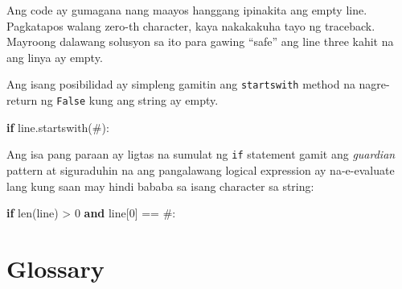 \documentclass[10pt,]{book}
\newenvironment{Shaded}{}{}
\newcommand{\BuiltInTok}[1]{\textcolor[rgb]{0.00,0.50,0.00}{#1}}
\newcommand{\ControlFlowTok}[1]{\textcolor[rgb]{0.00,0.44,0.13}{\textbf{#1}}}
\newcommand{\DecValTok}[1]{\textcolor[rgb]{0.25,0.63,0.44}{#1}}
\newcommand{\KeywordTok}[1]{\textcolor[rgb]{0.00,0.44,0.13}{\textbf{#1}}}
\newcommand{\NormalTok}[1]{#1}
\newcommand{\OperatorTok}[1]{\textcolor[rgb]{0.40,0.40,0.40}{#1}}
\newcommand{\StringTok}[1]{\textcolor[rgb]{0.25,0.44,0.63}{#1}}
\begin{document}
Ang code ay gumagana nang maayos hanggang ipinakita ang empty line.
Pagkatapos walang zero-th character, kaya nakakakuha tayo ng traceback.
Mayroong dalawang solusyon sa ito para gawing ``safe'' ang line three
kahit na ang linya ay empty.

Ang isang posibilidad ay simpleng gamitin ang \texttt{startswith} method
na nagre-return ng \texttt{False} kung ang string ay empty.

\begin{Shaded}
\begin{Highlighting}[]
\ControlFlowTok{if}\NormalTok{ line.startswith(}\StringTok{\textquotesingle{}\#\textquotesingle{}}\NormalTok{):}
\end{Highlighting}
\end{Shaded}

 

Ang isa pang paraan ay ligtas na sumulat ng \texttt{if} statement gamit
ang \emph{guardian} pattern at siguraduhin na ang pangalawang logical
expression ay na-e-evaluate lang kung saan may hindi bababa sa isang
character sa string:

\begin{Shaded}
\begin{Highlighting}[]
\ControlFlowTok{if} \BuiltInTok{len}\NormalTok{(line) }\OperatorTok{\textgreater{}} \DecValTok{0} \KeywordTok{and}\NormalTok{ line[}\DecValTok{0}\NormalTok{] }\OperatorTok{==} \StringTok{\textquotesingle{}\#\textquotesingle{}}\NormalTok{:}
\end{Highlighting}
\end{Shaded}

\section{Glossary}\label{glossary-5}
\end{document}
